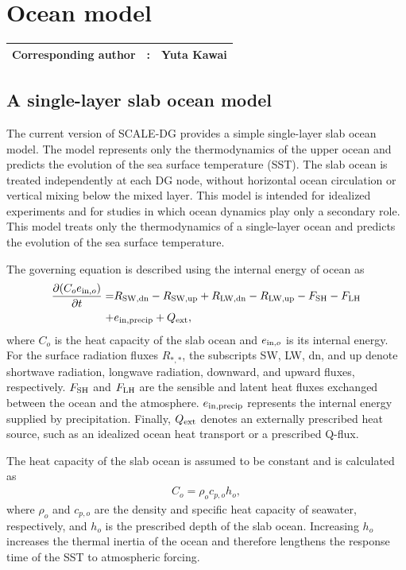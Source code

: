 \section{Ocean model}
{\bf \Large 
\begin{tabular}{ccc}
\hline
  Corresponding author & : & Yuta Kawai\\
\hline
\end{tabular}
}

\subsection{A single-layer slab ocean model}
The current version of SCALE-DG provides a simple single-layer slab ocean model.
The model represents only the thermodynamics of the upper ocean and predicts the evolution of the sea surface temperature (SST).
The slab ocean is treated independently at each DG node, without horizontal ocean circulation or vertical mixing below the mixed layer. 
This model is intended for idealized experiments and for studies in which ocean dynamics play only a secondary role.
This model treats only the thermodynamics of a single-layer ocean and predicts the evolution of the sea surface temperature.

The governing equation is described using the internal energy of ocean as
\begin{align}
  \dfrac{\partial (C_o e_{{\rm in},o})}{\partial t} =&
  R_{\rm SW,dn} - R_{\rm SW,up} + R_{\rm LW,dn} - R_{\rm LW,up} - F_{\rm SH} - F_{\rm LH} \nonumber \\
  +& e_{\rm in,precip} + Q_{\rm ext}, \label{eq:govern_eq_slab_ocean}
\end{align}
where $C_o$ is the heat capacity of the slab ocean and $e_{{\rm in},o}$ is its internal energy.
For the surface radiation fluxes $R_{*,*}$, the subscripts SW, LW, dn, and up denote shortwave radiation,
longwave radiation, downward, and upward fluxes, respectively.
$F_{\rm SH}$ and $F_{\rm LH}$ are the sensible and latent heat fluxes exchanged between the ocean and the atmosphere.
$e_{\rm in,precip}$ represents the internal energy supplied by precipitation.
Finally, $Q_{\rm ext}$ denotes an externally prescribed heat source,
such as an idealized ocean heat transport or a prescribed Q-flux.

The heat capacity of the slab ocean is assumed to be constant and is calculated as
\begin{align}
  C_o = \rho_o c_{p,o} h_o,
\end{align}
where $\rho_o$ and $c_{p,o}$ are the density and specific heat capacity of seawater,
respectively, and $h_o$ is the prescribed depth of the slab ocean.
Increasing $h_o$ increases the thermal inertia of the ocean 
and therefore lengthens the response time of the SST to atmospheric forcing.

